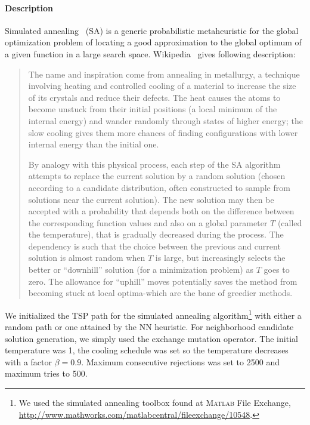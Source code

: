 ﻿\documentclass[a4paper,english,11pt,]{scrartcl}
\begin{document}
\paragraph{Description}
Simulated annealing~\cite{simulatedannealing} (SA) is a generic probabilistic metaheuristic for the global optimization problem of locating a good approximation to the global optimum of a given function in a large search space. 
Wikipedia~\cite{sawiki} gives following description:
\begin{quote}
The name and inspiration come from annealing in metallurgy, a technique involving heating and controlled cooling of a material to increase the size of its crystals and reduce their defects. The heat causes the atoms to become unstuck from their initial positions (a local minimum of the internal energy) and wander randomly through states of higher energy; the slow cooling gives them more chances of finding configurations with lower internal energy than the initial one.

By analogy with this physical process, each step of the SA algorithm attempts to replace the current solution by a random solution (chosen according to a candidate distribution, often constructed to sample from solutions near the current solution). The new solution may then be accepted with a probability that depends both on the difference between the corresponding function values and also on a global parameter $T$ (called the temperature), that is gradually decreased during the process. The dependency is such that the choice between the previous and current solution is almost random when $T$ is large, but increasingly selects the better or ``downhill'' solution (for a minimization problem) as $T$ goes to zero. The allowance for ``uphill'' moves potentially saves the method from becoming stuck at local optima-which are the bane of greedier methods. 
\end{quote}


We initialized the TSP path for the simulated annealing algorithm\footnote{We used the simulated annealing toolbox found at \textsc{Matlab} File Exchange, \url{http://www.mathworks.com/matlabcentral/fileexchange/10548}.} with either a random path or one attained by the NN heuristic.  For neighborhood candidate solution generation, we simply used the exchange mutation operator. The initial temperature was 1, the cooling schedule was set so the temperature decreases with a factor $\beta=0.9$. Maximum consecutive rejections was set to 2500 and maximum tries to 500.
                              
\end{document}
